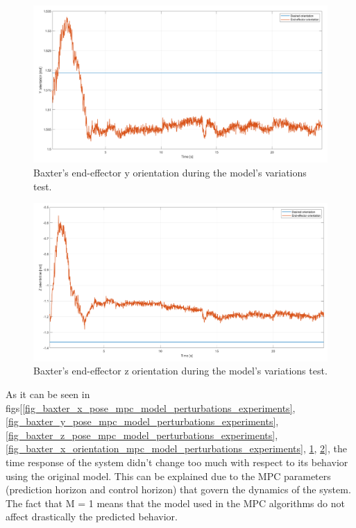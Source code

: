 \documentclass[11pt]{report} %
\begin{document}
\begin{figure}[H]
    \centering
    \includegraphics[width=1.0\linewidth]{assets/imgs/control_theory/mpc_regulation_model_changed/y_orientation.png}
    \caption{Baxter's end-effector y orientation during the model's variations test.} 
    \label{fig_baxter_y_orientation_mpc_model_perturbations_experiments}
\end{figure}

\begin{figure}[H]
    \centering
    \includegraphics[width=1.0\linewidth]{assets/imgs/control_theory/mpc_regulation_model_changed/z_orientation.png}
    \caption{Baxter's end-effector z orientation during the model's variations test.} 
    \label{fig_baxter_z_orientation_mpc_model_perturbations_experiments}
\end{figure}

As it can be seen in figs[\ref{fig_baxter_x_pose_mpc_model_perturbations_experiments}, \ref{fig_baxter_y_pose_mpc_model_perturbations_experiments}, \ref{fig_baxter_z_pose_mpc_model_perturbations_experiments}, \ref{fig_baxter_x_orientation_mpc_model_perturbations_experiments}, \ref{fig_baxter_y_orientation_mpc_model_perturbations_experiments}, \ref{fig_baxter_z_orientation_mpc_model_perturbations_experiments}], the time response of the system didn't change too much with respect to its behavior using the original model. This can be explained due to the MPC parameters (prediction horizon and control horizon) that govern the dynamics of the system. The fact that M = 1 means that the model used in the MPC algorithms do not affect drastically the predicted behavior. 
\end{document}
